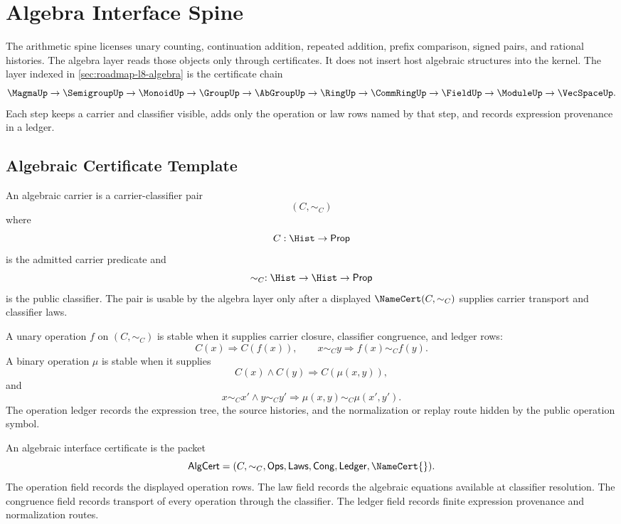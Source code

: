 \chapter{Algebra Interface Spine}
\label{ch:visions-algebra-interface-spine}

The arithmetic spine licenses unary counting, continuation addition,
repeated addition, prefix comparison, signed pairs, and rational histories.
The algebra layer reads those objects only through certificates.  It does not
insert host algebraic structures into the kernel.  The layer indexed in
\autoref{sec:roadmap-l8-algebra} is the certificate chain
$$
\MagmaUp
\to
\SemigroupUp
\to
\MonoidUp
\to
\GroupUp
\to
\AbGroupUp
\to
\RingUp
\to
\CommRingUp
\to
\FieldUp
\to
\ModuleUp
\to
\VecSpaceUp.
$$
Each step keeps a carrier and classifier visible, adds only the operation or
law rows named by that step, and records expression provenance in a ledger.

\section{Algebraic Certificate Template}
\label{sec:algebra-spine-template}

\begin{definition}
\label{def:algebra-spine-carrier}
An algebraic carrier is a carrier-classifier pair
$$
(C,\sim_C)
$$
where
$$
C:\Hist\to\mathsf{Prop}
$$
is the admitted carrier predicate and
$$
\sim_C:\Hist\to\Hist\to\mathsf{Prop}
$$
is the public classifier.  The pair is usable by the algebra layer only after
a displayed $\NameCert(C,\sim_C)$ supplies carrier transport and classifier
laws.
\end{definition}

\begin{definition}
\label{def:algebra-spine-stable-operations}
A unary operation $f$ on $(C,\sim_C)$ is stable when it supplies carrier
closure, classifier congruence, and ledger rows:
$$
C(x)\Longrightarrow C(f(x)),
\qquad
x\sim_C y\Longrightarrow f(x)\sim_C f(y).
$$
A binary operation $\mu$ is stable when it supplies
$$
C(x)\wedge C(y)\Longrightarrow C(\mu(x,y)),
$$
and
$$
x\sim_C x'\wedge y\sim_C y'
\Longrightarrow
\mu(x,y)\sim_C\mu(x',y').
$$
The operation ledger records the expression tree, the source histories, and
the normalization or replay route hidden by the public operation symbol.
\end{definition}

\begin{definition}
\label{def:algebra-spine-algcert}
An algebraic interface certificate is the packet
$$
\mathsf{AlgCert}
=
(C,\sim_C,\mathsf{Ops},\mathsf{Laws},
\mathsf{Cong},\mathsf{Ledger},\NameCert{}).
$$
The operation field records the displayed operation rows.  The law field
records the algebraic equations available at classifier resolution.  The
congruence field records transport of every operation through the classifier.
The ledger field records finite expression provenance and normalization
routes.
\end{definition}

